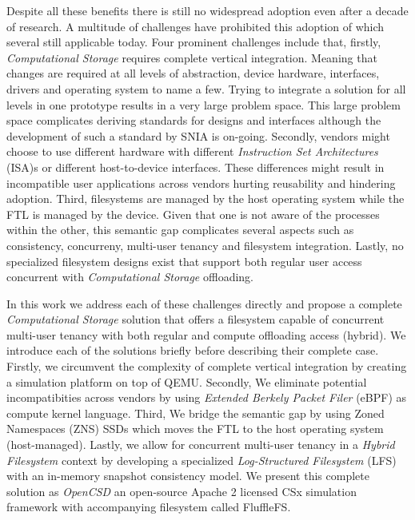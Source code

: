 \documentclass[conference]{IEEEtran}
\begin{document}

Despite all these benefits there is still no widespread adoption even after a
decade of research\cite{lukken2021past}. A multitude of challenges
have prohibited this adoption of which several still applicable today. Four
prominent challenges include that, firstly, \textit{Computational Storage}
requires complete vertical integration. Meaning that changes are required at all
levels of abstraction, device hardware, interfaces, drivers and operating system
to name a few. Trying to integrate a solution for all levels in one prototype
results in a very large problem space. This large problem space complicates
deriving standards for designs and interfaces although the development of such a
standard by SNIA is on-going\cite{snia-model}. Secondly, vendors might choose to
use different hardware with different
\textit{Instruction Set Architectures} (ISA)s or different host-to-device
interfaces. These differences might result in incompatible user applications
across vendors hurting reusability and hindering adoption. Third, filesystems
are managed by the host operating system while the FTL is
managed by the device. Given that one is not aware of the processes within the
other, this semantic gap complicates several aspects such as consistency,
concurreny, multi-user tenancy and filesystem integration. Lastly, no
specialized filesystem designs exist that support both regular user access
concurrent with \textit{Computational Storage} offloading.


In this work we address each of these challenges directly and propose a
complete \textit{Computational Storage} solution that offers a filesystem
capable of concurrent multi-user tenancy with both regular and compute
offloading access (hybrid). We introduce each of the solutions briefly before
describing their complete case. Firstly, we circumvent the complexity of
complete vertical integration by creating a simulation platform on top of
QEMU\cite{qemu}. Secondly, We eliminate potential incompatibities across vendors
by using \textit{Extended Berkely Packet Filer} (eBPF)\cite{what-ebpf} as
compute kernel language. Third, We bridge the semantic gap by using Zoned
Namespaces (ZNS)\cite{zns} SSDs which moves the FTL to the host operating
system (host-managed). Lastly, we allow for concurrent multi-user tenancy in
a \textit{Hybrid Filesystem} context by developing a specialized
\textit{Log-Structured Filesystem} (LFS)\cite{Rosenblum1992TheDA} with an
in-memory snapshot consistency model\cite{Viotti2016ConsistencyIN}. We present
this complete solution as \textit{OpenCSD} an open-source Apache 2 licensed CSx
simulation framework with accompanying filesystem called
FluffleFS\cite{qemu-csd}.
\end{document}
